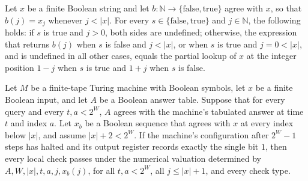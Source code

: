 \begin{theorem}
\label{Complexity.Meyer.xin_sj}
\leanok
{}
Let $x$ be a finite Boolean string and let $b : \mathbb{N} \to
\{\mathrm{false},\mathrm{true}\}$ agree with $x$, so that $b(j)=x_j$ whenever $j<|x|$.
For every $s\in\{\mathrm{false},\mathrm{true}\}$ and $j\in\mathbb{N}$, the following
holds: if $s$ is true and $j>0$, both sides are undefined; otherwise, the expression
that returns $b(j)$ when $s$ is false and $j<|x|$, or when $s$ is true and $j=0<|x|$,
and is undefined in all other cases, equals the partial lookup of $x$ at the integer
position $1-j$ when $s$ is true and $1+j$ when $s$ is false.
\end{theorem}

\begin{theorem}
\label{Complexity.Meyer.complete_numeric}
\leanok
{}
Let $M$ be a finite-tape Turing machine with Boolean symbols, let $x$ be a finite
Boolean input, and let $A$ be a Boolean answer table. Suppose that for every query and
every $t,a<2^W$, $A$ agrees with the machine's tabulated answer at time $t$ and index
$a$. Let $x_b$ be a Boolean sequence that agrees with $x$ at every index below $|x|$,
and assume $|x|+2<2^W$. If the machine's configuration after $2^W-1$ steps has halted
and its output register records exactly the single bit $1$, then every local check
passes under the numerical valuation determined by $A,W,|x|,t,a,j,x_b(j)$, for all
$t,a<2^W$, all $j\le |x|+1$, and every check type.
\end{theorem}
